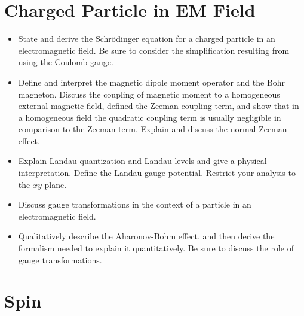 \section{Charged Particle in EM Field}

\begin{itemize}

    \item State and derive the Schrödinger equation for a charged particle in an electromagnetic field. Be sure to consider the simplification resulting from using the Coulomb gauge.

    \item Define and interpret the magnetic dipole moment operator and the Bohr magneton. Discuss the coupling of magnetic moment to a homogeneous external magnetic field, defined the Zeeman coupling term, and show that in a homogeneous field the quadratic coupling term is usually negligible in comparison to the Zeeman term. Explain and discuss the normal Zeeman effect.

    \item Explain Landau quantization and Landau levels and give a physical interpretation. Define the Landau gauge potential. Restrict your analysis to the $ xy $ plane.

    \item Discuss gauge transformations in the context of a particle in an electromagnetic field.

    \item Qualitatively describe the Aharonov-Bohm effect, and then derive the formalism needed to explain it quantitatively. Be sure to discuss the role of gauge transformations.

\end{itemize}

\section{Spin}

